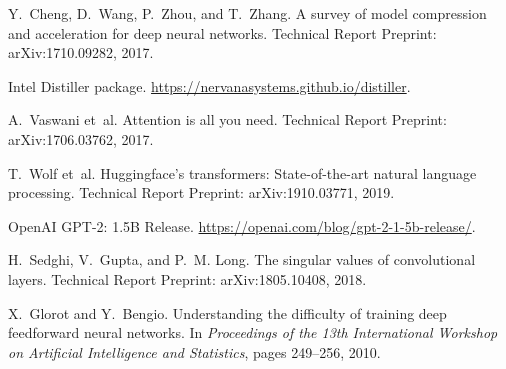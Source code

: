 \documentclass[11pt]{article}
\begin{document}
{\begin{thebibliography}{10}
Y.~Cheng, D.~Wang, P.~Zhou, and T.~Zhang.
\newblock A survey of model compression and acceleration for deep neural
  networks.
\newblock Technical Report Preprint: arXiv:1710.09282, 2017.

{Intel Distiller package}.
\newblock \url{https://nervanasystems.github.io/distiller}.

A.~Vaswani et~al.
\newblock Attention is all you need.
\newblock Technical Report Preprint: arXiv:1706.03762, 2017.

T.~Wolf et~al.
\newblock Huggingface's transformers: State-of-the-art natural language
  processing.
\newblock Technical Report Preprint: arXiv:1910.03771, 2019.

{OpenAI GPT-2: 1.5B Release}.
\newblock \url{https://openai.com/blog/gpt-2-1-5b-release/}.

H.~Sedghi, V.~Gupta, and P.~M. Long.
\newblock The singular values of convolutional layers.
\newblock Technical Report Preprint: arXiv:1805.10408, 2018.

X.~Glorot and Y.~Bengio.
\newblock Understanding the difficulty of training deep feedforward neural
  networks.
\newblock In {\em Proceedings of the 13th International Workshop on Artificial
  Intelligence and Statistics}, pages 249--256, 2010.

\end{thebibliography}

}

\appendix

\end{document}
